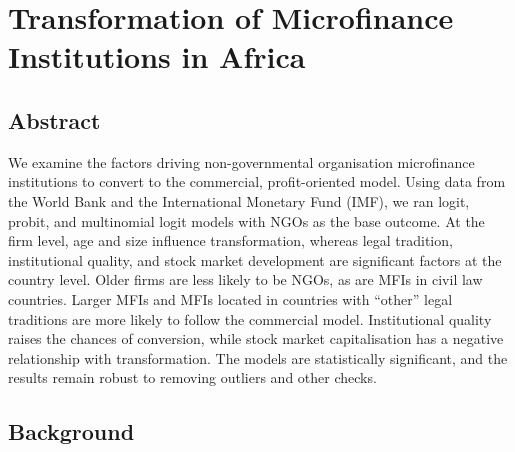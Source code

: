 \documentclass[a4paper,nobind]{templates/ociamthesis}
\begin{document}
\setlength{\textbaselineskip}{22pt plus2pt}

\setlength{\parskip}{2pt plus 1pt}

\setlength{\baselineskip}{\textbaselineskip}

\hypertarget{cites-and-refs}{%
\chapter{Transformation of Microfinance Institutions in Africa}\label{cites-and-refs}}


\minitoc 

\hypertarget{abstract}{%
\section{\texorpdfstring{\textbf{Abstract}}{Abstract}}\label{abstract}}

We examine the factors driving non-governmental organisation microfinance institutions to convert to the commercial, profit-oriented model. Using data from the World Bank and the International Monetary Fund (IMF), we ran logit, probit, and multinomial logit models with NGOs as the base outcome. At the firm level, age and size influence transformation, whereas legal tradition, institutional quality, and stock market development are significant factors at the country level. Older firms are less likely to be NGOs, as are MFIs in civil law countries. Larger MFIs and MFIs located in countries with ``other'' legal traditions are more likely to follow the commercial model. Institutional quality raises the chances of conversion, while stock market capitalisation has a negative relationship with transformation. The models are statistically significant, and the results remain robust to removing outliers and other checks.

\newpage

\hypertarget{background}{%
\section{\texorpdfstring{\textbf{Background}}{Background}}\label{background}}
\end{document}
